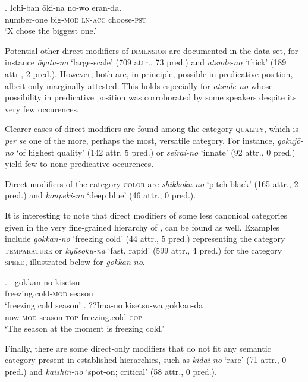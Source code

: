 \documentclass [output=book,colorlinks,citecolor=brown]{langscibook}
\begin{document}
\exg. Ichi-ban ōki-na no-wo eran-da.\\
number-one big-\textsc{mod} \textsc{ln}-\textsc{acc} choose-\textsc{pst}\\
`X chose the biggest one.’ \hfill \citep[1: 28]{sekine:1937:fukutaishi}

Potential other direct modifiers of \textsc{dimension} are documented in the data set, for instance \textit{ōgata-no} `large-scale' (709 attr., 73 pred.) and \textit{atsude-no} `thick’ (189 attr., 2 pred.). However, both are, in principle, possible in predicative position, albeit only marginally attested. This holds especially for \textit{atsude-no} whose possibility in predicative position was corroborated by some speakers despite its very few occurences. %

Clearer cases of direct modifiers are found among the category \textsc{quality}, which is \textit{per se} one of the more, perhaps the most, versatile category. For instance, \textit{gokujō-no} `of highest quality' (142 attr. 5 pred.) or \textit{seirai-no} `innate’ (92 attr., 0 pred.) yield few to none predicative occurences.

Direct modifiers of the category \textsc{color} are \textit{shikkoku-no} `pitch black' (165 attr., 2 pred.) and \textit{konpeki-no} `deep blue’ (46 attr., 0 pred.). %

It is interesting to note that direct modifiers of some less canonical categories given in the very fine-grained hierarchy of \citet[106, 114]{scott:2002:stacked}, can be found as well. Examples include \textit{gokkan-no} `freezing cold’ (44 attr., 5 pred.) representing the category \textsc{temparature} or \textit{kyūsoku-na} `fast, rapid’ (599 attr., 4 pred.) for the category \textsc{speed}, illustrated below for \textit{gokkan-no}.


\ex. \ag. gokkan-no kisetsu\\
freezing.cold-\textsc{mod} season\\
`freezing cold season'
\bg. ??Ima-no kisetsu-wa gokkan-da\\
now-\textsc{mod} season-\textsc{top} freezing.cold-\textsc{cop}\\
`The season at the moment is freezing cold.’

Finally, there are some direct-only modifiers that do not fit any semantic category present in established hierarchies, such as \textit{kidai-no} `rare’ (71 attr., 0 pred.) and \textit{kaishin-no} `spot-on; critical’ (58 attr., 0 pred.).
\end{document}
